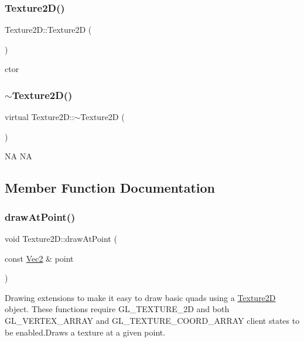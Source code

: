 \subsubsection{\texorpdfstring{Texture2\+D()}{Texture2D()}\hspace{0.1cm}{\footnotesize\ttfamily [2/2]}}
{\footnotesize\ttfamily Texture2\+D\+::\+Texture2D (\begin{DoxyParamCaption}{ }\end{DoxyParamCaption})}

ctor \mbox{\label{classTexture2D_a7871eee8e1b6621b4fb15cc767778459}} 
\subsubsection{\texorpdfstring{$\sim$\+Texture2\+D()}{~Texture2D()}\hspace{0.1cm}{\footnotesize\ttfamily [2/2]}}
{\footnotesize\ttfamily virtual Texture2\+D\+::$\sim$\+Texture2D (\begin{DoxyParamCaption}{ }\end{DoxyParamCaption})\hspace{0.3cm}{\ttfamily [virtual]}}

NA  NA 

\subsection{Member Function Documentation}
\mbox{\label{classTexture2D_a58fcaf9540bdeac3b4858d0c3eaa5b97}} 
\subsubsection{\texorpdfstring{draw\+At\+Point()}{drawAtPoint()}\hspace{0.1cm}{\footnotesize\ttfamily [1/2]}}
{\footnotesize\ttfamily void Texture2\+D\+::draw\+At\+Point (\begin{DoxyParamCaption}\item[{const \hyperlink{classVec2}{Vec2} \&}]{point }\end{DoxyParamCaption})}

Drawing extensions to make it easy to draw basic quads using a \hyperlink{classTexture2D}{Texture2D} object. These functions require G\+L\+\_\+\+T\+E\+X\+T\+U\+R\+E\+\_\+2D and both G\+L\+\_\+\+V\+E\+R\+T\+E\+X\+\_\+\+A\+R\+R\+AY and G\+L\+\_\+\+T\+E\+X\+T\+U\+R\+E\+\_\+\+C\+O\+O\+R\+D\+\_\+\+A\+R\+R\+AY client states to be enabled.\+Draws a texture at a given point. \mbox{\label{classTexture2D_a58fcaf9540bdeac3b4858d0c3eaa5b97}} 
